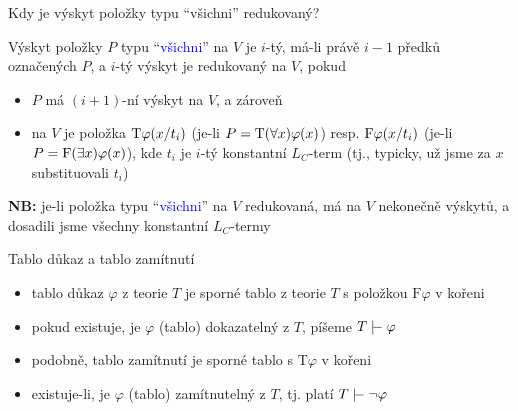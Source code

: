 \documentclass{beamer}
\begin{document}
\begin{frame}{Kdy je výskyt položky typu ``všichni'' redukovaný?}
    
    \pause
    Výskyt položky $P$ typu ``\textcolor{blue}{všichni}'' na $V$ je \alert{$i$-tý}, má-li právě $i-1$ předků označených $P$, a \alert{$i$-tý výskyt je redukovaný} na $V$, pokud\pause
    \begin{itemize}
        \item $P$ má $(i+1)$-ní výskyt na $V$, a zároveň\pause
        \item na $V$ je položka \alert{$\mathrm{T}\varphi(x/t_i)$} (je-li $P=\mathrm{T}(\forall x)\varphi(x)$) resp. \alert{$\mathrm{F}\varphi(x/t_i)$} (je-li $P=\mathrm{F}(\exists x)\varphi(x)$), kde $t_i$ je $i$-tý konstantní $L_C$-term (tj., typicky, už jsme za $x$ substituovali $t_i$)\pause
    \end{itemize} 


    \textbf{NB:} je-li položka typu ``\textcolor{blue}{všichni}'' na $V$ redukovaná, má na $V$ nekonečně výskytů, a dosadili jsme všechny konstantní $L_C$-termy

\end{frame}


\begin{frame}{Tablo důkaz a tablo zamítnutí}

    \begin{itemize}[<+->]
        \item \alert{tablo důkaz}  $\varphi$ z teorie $T$ je \alert{sporné} tablo z teorie $T$ s položkou $\mathrm{F}\varphi$ v kořeni
        \item pokud existuje, je $\varphi$ \alert{(tablo) dokazatelný} z $T$, píšeme \alert{$T\proves\varphi$}
        \item podobně, \alert{tablo zamítnutí} je sporné tablo s $\mathrm{T}\varphi$ v kořeni
        \item existuje-li, je $\varphi$ \alert{(tablo) zamítnutelný} z $T$, tj. platí \alert{$T\proves\neg\varphi$}
    \end{itemize}

\end{frame}
\end{document}
